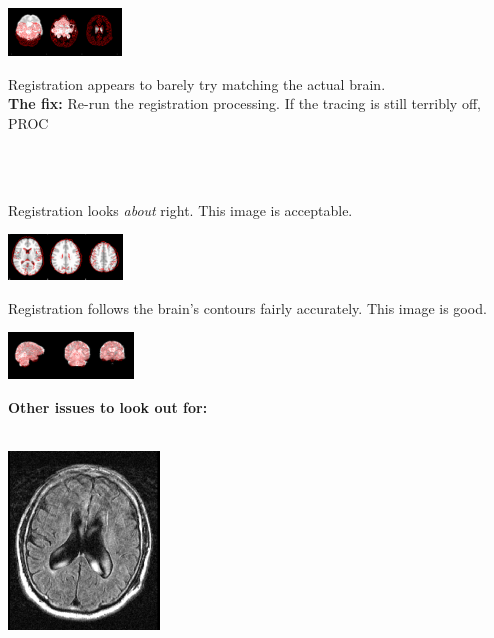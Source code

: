 \documentclass{article}
\begin{document}
\noindent\begin{minipage}{0.45\textwidth}
	\includegraphics[scale=1.5]{badreg3.png}
\end{minipage}%
\hfill%
\begin{minipage}{0.45\textwidth}
	Registration appears to barely try matching the actual brain. \\
	\textbf{The fix:} Re-run the registration processing. If the tracing is still terribly off, PROC
\end{minipage}\\\\
\noindent\begin{minipage}{0.45\textwidth}
	Registration looks \emph{about} right. This image is acceptable. 
\end{minipage}%
\hfill%
\begin{minipage}{0.45\textwidth}
	\includegraphics[scale=1.485]{reg_good1.png}
\end{minipage}
\noindent\begin{minipage}{0.45\textwidth}
	Registration follows the brain's contours fairly accurately. This image is good. 
\end{minipage}%
\hfill%
\begin{minipage}{0.45\textwidth}
	\includegraphics[scale=1.355]{reg_good2.png}
\end{minipage}
\newpage
\noindent\textbf{Other issues to look out for:}\\\\
\noindent\begin{minipage}{0.3\textwidth}
	\includegraphics[scale=0.75]{T1_bad1.png}
\end{minipage}%
\end{document}
